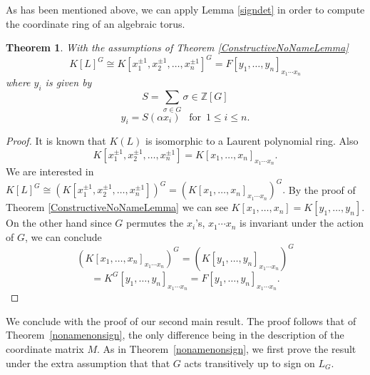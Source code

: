\documentclass[12pt]{article}
\theoremstyle{plain}
\newtheorem{theorem}{Theorem}
\newcommand{\Z}{\ensuremath{\mathbb{Z}}}
\begin{document}
As has been mentioned above, we can apply Lemma \ref{signdet} in order to compute the coordinate ring of an algebraic torus. 
\begin{theorem}
With the assumptions of Theorem \ref{ConstructiveNoNameLemma} $$K[L]^G
\cong K[x^{\pm 1}_1, x^{\pm 1}_2, \ldots , x^{\pm 1}_n]^G = F[y_1,
  \ldots , y_n]_{x_1\cdots x_n}$$ where $ y_i$ is given by $$S =
\sum_{\sigma \in G} \sigma \in \Z[G]$$
$$y_i = S(\alpha x_i)  \,\,\,\,\, \text{for} \,\,\, 1\leq i \leq n.$$
\end{theorem}
\begin{proof}
It is known that $K(L)$ is isomorphic to a Laurent polynomial ring. Also $$K[x^{\pm 1}_1, x^{\pm 1}_2, \ldots , x^{\pm 1}_n] = K[x_1, \ldots , x_n]_{x_1\cdots x_n}.$$ We are interested in $K[L]^G \cong \left( K[x^{\pm 1}_1, x^{\pm 1}_2, \ldots , x^{\pm 1}_n] \right)^G = \left(K[x_1, \ldots , x_n]_{x_1\cdots x_n} \right) ^G.$ By the proof of Theorem \ref{ConstructiveNoNameLemma} we can see $K[x_1, \ldots , x_n] = K[y_1, \ldots , y_n]$. 
On the other hand since $G$ permutes the $x_i$'s, $x_1\cdots x_n$ is invariant under the action of $G$, we can conclude $$\left( K[x_1, \ldots , x_n]_{x_1\cdots x_n}\right)^G =  \left( K[y_1, \ldots , y_n]_{x_1\cdots x_n} \right)^G$$$$ = K^G [y_1, \ldots , y_n]_{x_1\cdots x_n} =  F[y_1, \ldots , y_n]_{x_1\cdots x_n}.$$ 
\end{proof}



We conclude with the proof of our second main result.  The proof
follows that of Theorem~\ref{nonamenonsign}, the only difference being in
the description of the coordinate matrix $M$.  As in
Theorem~\ref{nonamenonsign}, we first prove the result under the extra
assumption that that $G$ acts transitively up to sign on $L_G$.
\end{document}
